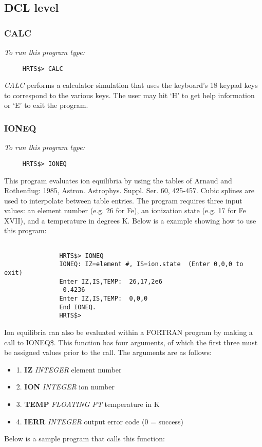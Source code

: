 \subsection{DCL level}

\subsubsection{CALC}

{\em To run this program type:}
\begin{verbatim}   
     HRTS$> CALC                    
\end{verbatim}
       {\em CALC} performs a calculator simulation that uses the keyboard's 18
   keypad keys to correspond to the various keys. 
        The user may hit `H' to get help information or `E' to exit the
   program.

\subsubsection{IONEQ}

{\em To run this program type:}
\begin{verbatim}
     HRTS$> IONEQ                  
\end{verbatim}
      This program evaluates ion equilibria by using the tables of Arnaud
   and Rothenflug: 1985, Astron. Astrophys. Suppl. Ser. 60, 425-457. Cubic
   splines are used to interpolate between table entries.  The program
   requires three input values: an element number (e.g. 26 for Fe), an
   ionization state (e.g. 17 for Fe XVII), and a temperature in degrees K.
   Below is a example showing how to use this program:

\begin{verbatim}

               HRTS$> IONEQ
               IONEQ: IZ=element #, IS=ion.state  (Enter 0,0,0 to exit)
               Enter IZ,IS,TEMP:  26,17,2e6
                0.4236
               Enter IZ,IS,TEMP:  0,0,0
               End IONEQ.
               HRTS$>
\end{verbatim}
            Ion equilibria can also be evaluated within a FORTRAN program by
   making a call to IONEQ\$. This function has four arguments, of which the
   first three must be assigned values prior to the call. The arguments
   are as follows:
\begin{itemize}   
\item     1. {\bf IZ}    {\em INTEGER}        element number
\item     2. {\bf ION}   {\em INTEGER}        ion number
\item     3. {\bf TEMP}  {\em FLOATING PT}    temperature in K
\item     4. {\bf IERR}  {\em INTEGER}        output error code (0 = success)
\end{itemize}   
        Below is a sample program that calls this function:

